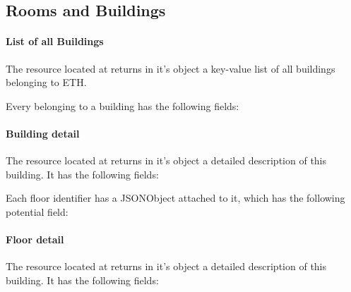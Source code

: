 \subsection{Rooms and Buildings}

\paragraph{List of all Buildings}
The resource located at  returns in it's  object a key-value list of all buildings belonging to ETH.
\begin{description}
\end{description}
Every  belonging to a building has the following fields:
\begin{description}
\end{description}

\paragraph{Building detail}
The resource located at  returns in it's  object a detailed description of this building. It has the following fields:
\begin{description}
\end{description}
Each floor identifier has a JSONObject attached to it, which has the following potential field:
\begin{description}
\end{description}

\paragraph{Floor detail}
The resource located at  returns in it's  object a detailed description of this building. It has the following fields:
\begin{description}
\end{description}
